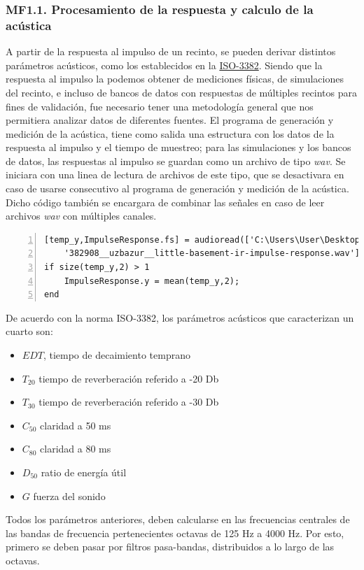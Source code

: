 \subsubsection{MF1.1. Procesamiento de la respuesta y calculo de la acústica}
A partir de la respuesta al impulso de un recinto, se pueden derivar distintos parámetros acústicos, como los establecidos en la \href{https://www.iso.org/standard/36201.html}{ISO-3382}. Siendo que la respuesta al impulso la podemos obtener de mediciones físicas, de simulaciones del recinto, e incluso de bancos de datos con respuestas de múltiples recintos para fines de validación, fue necesario tener una metodología general que nos permitiera analizar datos de diferentes fuentes. \hfill\break
El programa de generación y medición de la acústica, tiene como salida una estructura con los datos de la respuesta al impulso y el tiempo de muestreo; para las simulaciones y los bancos de datos, las respuestas al impulso se guardan como un archivo de tipo \textit{wav}. Se iniciara con una linea de lectura de archivos de este tipo, que se desactivara en caso de usarse consecutivo al programa de generación y medición de la acústica. Dicho código también se encargara de combinar las señales en caso de leer archivos \textit{wav} con múltiples canales.
\begin{lstlisting}[frame=single,numbers=left, style=Matlab-editor, basicstyle=\tiny]
[temp_y,ImpulseResponse.fs] = audioread(['C:\Users\User\Desktop\RIR_Database\' ...
    '382908__uzbazur__little-basement-ir-impulse-response.wav']);
if size(temp_y,2) > 1
    ImpulseResponse.y = mean(temp_y,2);
end
\end{lstlisting}
De acuerdo con la norma ISO-3382, los parámetros acústicos que caracterizan un cuarto son:
\begin{itemize}
    \item $EDT$, tiempo de decaimiento temprano
    \item $T_{20}$ tiempo de reverberación referido a -20 Db
    \item $T_{30}$ tiempo de reverberación referido a -30 Db
    \item $C_{50}$ claridad a 50 ms
    \item $C_{80}$ claridad a 80 ms
    \item $D_{50}$ ratio de energía útil
    \item $G$ fuerza del sonido 
\end{itemize}
Todos los parámetros anteriores, deben calcularse en las frecuencias centrales de las bandas de frecuencia pertenecientes octavas de 125 Hz a 4000 Hz. Por esto, primero se deben pasar por filtros pasa-bandas, distribuidos a lo largo de las octavas.
